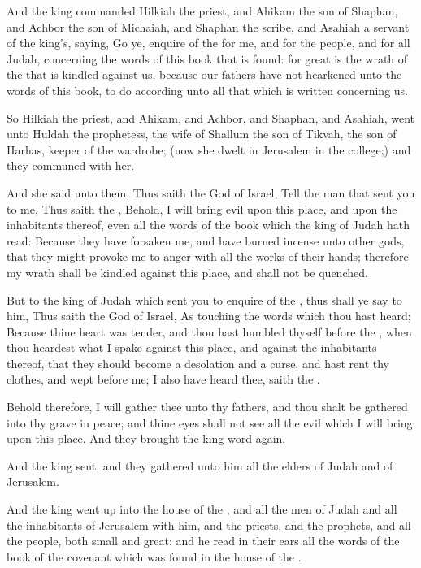 \Verse And the king commanded Hilkiah the priest, and Ahikam the son of Shaphan, and Achbor the son of Michaiah, and Shaphan the scribe, and Asahiah a servant of the king's, saying, \Verse Go ye, enquire of the \LORD for me, and for the people, and for all Judah, concerning the words of this book that is found: for great is the wrath of the \LORD that is kindled against us, because our fathers have not hearkened unto the words of this book, to do according unto all that which is written concerning us.

\Verse So Hilkiah the priest, and Ahikam, and Achbor, and Shaphan, and Asahiah, went unto Huldah the prophetess, the wife of Shallum the son of Tikvah, the son of Harhas, keeper of the wardrobe; (now she dwelt in Jerusalem in the college;) and they communed with her.

\Verse And she said unto them, Thus saith the \LORD God of Israel, Tell the man that sent you to me, \Verse Thus saith the \LORD, Behold, I will bring evil upon this place, and upon the inhabitants thereof, even all the words of the book which the king of Judah hath read: \Verse Because they have forsaken me, and have burned incense unto other gods, that they might provoke me to anger with all the works of their hands; therefore my wrath shall be kindled against this place, and shall not be quenched.

\Verse But to the king of Judah which sent you to enquire of the \LORD, thus shall ye say to him, Thus saith the \LORD God of Israel, As touching the words which thou hast heard; \Verse Because thine heart was tender, and thou hast humbled thyself before the \LORD, when thou heardest what I spake against this place, and against the inhabitants thereof, that they should become a desolation and a curse, and hast rent thy clothes, and wept before me; I also have heard thee, saith the \LORD.

\Verse Behold therefore, I will gather thee unto thy fathers, and thou shalt be gathered into thy grave in peace; and thine eyes shall not see all the evil which I will bring upon this place. And they brought the king word again.


\Chapter
\Verse And the king sent, and they gathered unto him all the elders of Judah and of Jerusalem.

\Verse And the king went up into the house of the \LORD, and all the men of Judah and all the inhabitants of Jerusalem with him, and the priests, and the prophets, and all the people, both small and great: and he read in their ears all the words of the book of the covenant which was found in the house of the \LORD.


